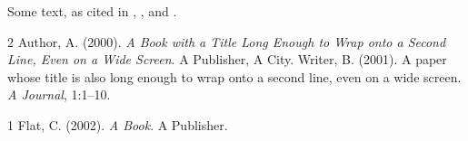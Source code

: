 \documentclass{article}
\begin{document}
Some text, as cited in \citet{book}, \citep{paper}, and \citet{flat}.
\begin{thebibliography}{2}
 Author, A. (2000). \emph{A Book with a Title
  Long Enough to Wrap onto a Second Line, Even on a Wide Screen}. A Publisher,
  A City.
 Writer, B. (2001). A paper whose title is also
  long enough to wrap onto a second line, even on a wide screen. \emph{A
  Journal}, 1:1--10.
\end{thebibliography}
{\setlength{\bibhang}{0pt}
\begin{thebibliography}{1}
 Flat, C. (2002). \emph{A Book}. A Publisher.
\end{thebibliography}}
\end{document}
